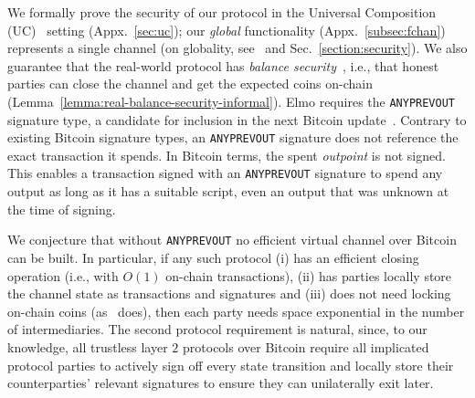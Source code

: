   We formally prove the security of our protocol in the Universal
  Composition (UC)~\cite{uc} setting (Appx.~\ref{sec:uc}); our \emph{global} functionality
  \fchan (Appx.~\ref{subsec:fchan}) represents
  a single channel (on globality, see~\cite{DBLP:conf/tcc/BadertscherCHTZ20} and
  Sec.~\ref{section:security}). We also guarantee that the real-world protocol
  \pchan has \emph{balance security}~\cite{why3ln}, i.e., that honest parties can close
  the channel and get the expected coins on-chain
  (Lemma~\ref{lemma:real-balance-security-informal}).
%
  Elmo requires the \texttt{ANYPREVOUT} signature type, a candidate for
  inclusion in the next Bitcoin update~\cite{anyprevout}. Contrary to existing
  Bitcoin signature types, an \texttt{ANYPREVOUT} signature does not reference
  the exact transaction it spends. In Bitcoin terms, the spent \emph{outpoint}
  is not signed. This enables a transaction signed with an \texttt{ANYPREVOUT}
  signature to spend any output as long as it has a suitable script, even an
  output that was unknown at the time of signing.

  We conjecture that without
  \texttt{ANYPREVOUT} no efficient virtual channel
  over Bitcoin can be built. In particular, if any such protocol
  (i) has an efficient closing operation (i.e., with $O(1)$ on-chain
  transactions), (ii) has parties locally store the channel state as transactions and
  signatures and (iii) does not need locking on-chain
  coins (as~\cite{donner} does), then each party needs space exponential
  in the number of intermediaries. The second protocol
  requirement is natural, since, to our knowledge, all trustless layer $2$
  protocols over Bitcoin require all implicated protocol parties to actively
  sign off every state transition and locally store their counterparties' relevant
  signatures to ensure they can unilaterally exit later.

